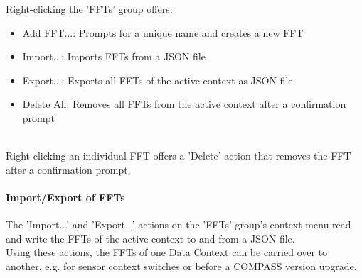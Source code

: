 Right-clicking the 'FFTs' group offers:

\begin{itemize}
\item Add FFT...: Prompts for a unique name and creates a new FFT
\item Import...: Imports FFTs from a JSON file
\item Export...: Exports all FFTs of the active context as JSON file
\item Delete All: Removes all FFTs from the active context after a confirmation prompt
\end{itemize}
\ \\

Right-clicking an individual FFT offers a 'Delete' action that removes the FFT after a confirmation prompt. \\

\paragraph{Import/Export of FFTs}
\label{sec:config_fft_export}

The 'Import...' and 'Export...' actions on the 'FFTs' group's context menu read and write the FFTs of the active context to and from a JSON file. \\

Using these actions, the FFTs of one Data Context can be carried over to another, e.g. for sensor context switches or before a COMPASS version upgrade.
